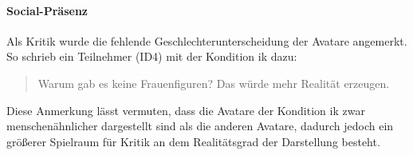\documentclass[a4paper,11pt]{article}%
\renewcommand{\\}{\vspace*{0.5\baselineskip} \newline}
\begin{document}
{{\paragraph{Social-Präsenz} Als Kritik wurde die fehlende Geschlechterunterscheidung der Avatare angemerkt. So schrieb ein Teilnehmer (ID4) mit der Kondition \ac{ik} dazu:
\begin{quote}
\glqq{}Warum gab es keine Frauenfiguren? Das würde mehr Realität erzeugen.\dq{}
\end{quote}
Diese Anmerkung lässt vermuten, dass die Avatare der Kondition \ac{ik} zwar menschenähnlicher dargestellt sind als die anderen Avatare, dadurch jedoch ein größerer Spielraum für Kritik an dem Realitätsgrad der Darstellung besteht.
%
%
%
}}
\end{document}
